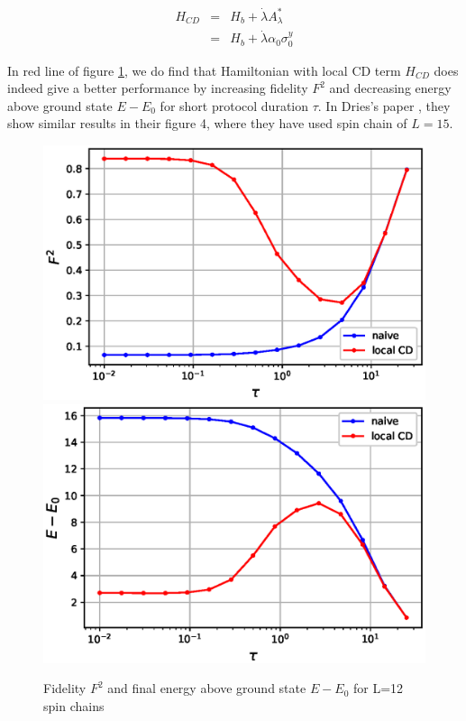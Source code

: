 \documentclass[11pt,a4paper]{article}
\begin{document}
\begin{eqnarray}
H_{CD}&=&H_b + \dot{\lambda} A_{\lambda}^* \\
&=&H_b + \dot{\lambda} \alpha_0 \sigma_0^y 
\end{eqnarray}

In red line of figure \ref{fid_energ}, we do find that Hamiltonian with local CD term $H_{CD}$ does indeed give a better performance by increasing fidelity $F^2$ and decreasing energy above ground state $E-E_0$ for short protocol duration $\tau$. 
In Dries's paper \cite{sels2017minimizing}, they show  similar results in their figure 4, where they have used spin chain of $L=15$.



\begin{figure}
\centering
\includegraphics[scale=0.5]{fidelity_naive.eps}
\includegraphics[scale=0.5]{final_energy_naive.eps}
\caption{Fidelity $F^2$ and final energy above ground state $E- E_0$ for L=12 spin chains}
\label{fid_energ}
\end{figure}
\end{document}
